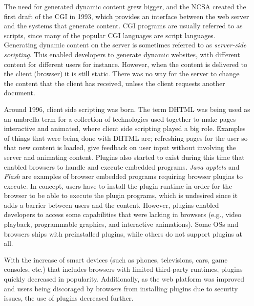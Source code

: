 \documentclass[a4paper,11pt]{kth-mag}
\begin{document}
        The need for generated dynamic content grew bigger, and the \gls{NCSA} created the first draft of the \gls{CGI} in 1993, which provides an interface between the \gls{web} server and the systems that generate content.
        \gls{CGI} programs are usually referred to as scripts, since many of the popular \gls{CGI} languages are script languages.
        Generating dynamic content on the server is sometimes referred to as \emph{server-side scripting}.
        This enabled developers to generate dynamic websites, with different content for different users for instance.
        However, when the content is delivered to the client (\gls{browser}) it is still static.
        There was no way for the server to change the content that the client has received, unless the client requests another \gls{document}.

        Around 1996, client side scripting was born.
        The term \gls{DHTML} was being used as an umbrella term for a collection of technologies used together to make pages interactive and animated, where client side scripting played a big role.
        Examples of things that were being done with \gls{DHTML} are; refreshing pages for the user so that new content is loaded, give feedback on user input without involving the server and animating content.
        Plugins also started to exist during this time that enabled \glspl{browser} to handle and execute embedded programs.
        \emph{\glspl{Java applet}} and \emph{\gls{Flash}} are examples of browser embedded programs requiring browser plugins to execute.
        In concept, users have to install the plugin runtime in order for the browser to be able to execute the plugin programs, which is undesired since it adds a barrier between users and the content.
        However, plugins enabled developers to access some capabilities that were lacking in browsers (e.g., video playback, programmable graphics, and interactive animations).
        Some \glspl{OS} and \glspl{browser} ships with preinstalled plugins, while others do not support plugins at all.

        With the increase of smart devices (such as phones, televisions, cars, game consoles, etc.) that includes \glspl{browser} with limited \gls{third-party} runtimes, plugins quickly decreased in popularity.
        Additionally, as the web platform was improved and users being discoraged by browsers from installing plugins due to security issues, the use of plugins decreased further.
\end{document}
